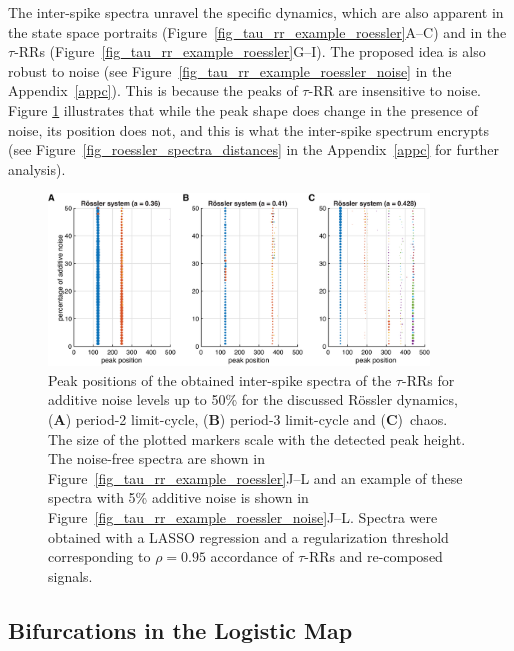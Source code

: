 \documentclass[entropy,article,accept,pdftex,moreauthors]{Definitions/mdpi}
\begin{document}
The inter-spike spectra unravel the specific dynamics, which are also apparent in the state space portraits (Figure~\ref{fig_tau_rr_example_roessler}A--C) and in the 
$\tau$-RRs (Figure~\ref{fig_tau_rr_example_roessler}G--I). The proposed idea is also 
robust to noise (see Figure~\ref{fig_tau_rr_example_roessler_noise} in the Appendix~\ref{appc}). This is because the peaks of $\tau$-RR are insensitive to noise. 
Figure \ref{fig_roessler_peaks} illustrates that 
while the peak shape does change in the presence of noise, its position does not, and this is what the inter-spike spectrum encrypts 
(see Figure~\ref{fig_roessler_spectra_distances} in the Appendix~\ref{appc} for further analysis).

\begin{figure}[H]
 \includegraphics[width=0.9\textwidth]{./figures/fig_roessler_different_noise_levels_peaks}
 \caption{Peak positions of the obtained inter-spike spectra of the $\tau$-RRs for additive noise levels up to 50\% for the discussed R\"ossler dynamics, 
 (\textbf{A}) period-2 limit-cycle, (\textbf{B}) period-3 limit-cycle and (\textbf{C})~chaos. The size of the plotted markers scale with the detected peak height. The noise-free spectra are shown in Figure~\ref{fig_tau_rr_example_roessler}J--L and 
 an example of these spectra with 5\% additive noise is shown in Figure~\ref{fig_tau_rr_example_roessler_noise}J--L. Spectra were obtained with a LASSO regression and a regularization threshold 
  corresponding to $\rho=0.95$ accordance of $\tau$-RRs and re-composed signals.}
\label{fig_roessler_peaks}
\end{figure}


\subsection{Bifurcations in the Logistic Map}
\end{document}
